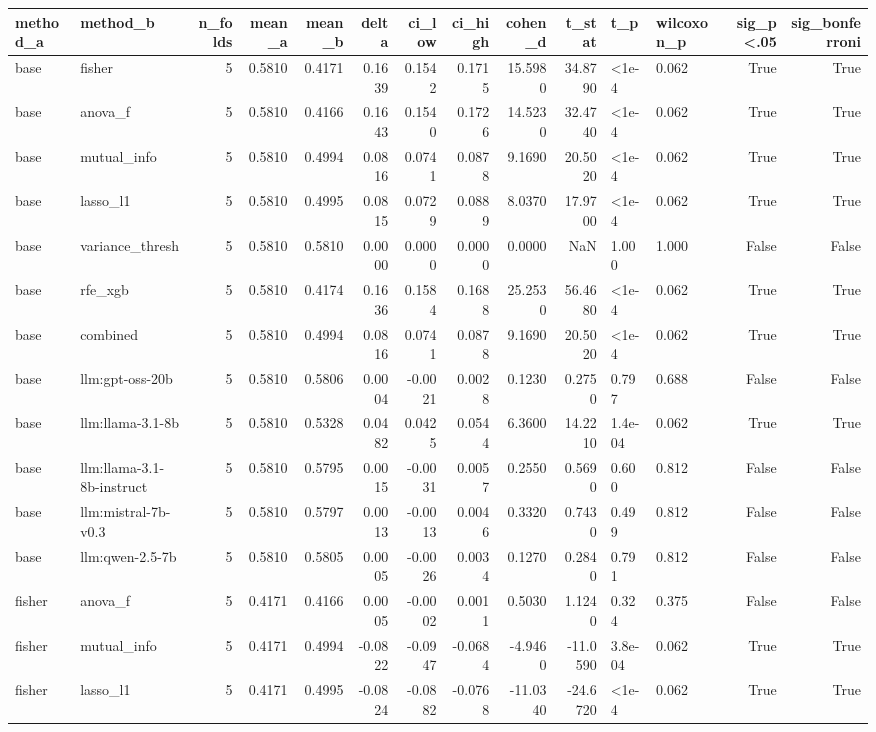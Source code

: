 \begin{tabular}{llrrrrrrrrllrr}
\toprule
method_a & method_b & n_folds & mean_a & mean_b & delta & ci_low & ci_high & cohen_d & t_stat & t_p & wilcoxon_p & sig_p<.05 & sig_bonferroni \\
\midrule
base & fisher & 5 & 0.5810 & 0.4171 & 0.1639 & 0.1542 & 0.1715 & 15.5980 & 34.8790 & <1e-4 & 0.062 & True & True \\
base & anova_f & 5 & 0.5810 & 0.4166 & 0.1643 & 0.1540 & 0.1726 & 14.5230 & 32.4740 & <1e-4 & 0.062 & True & True \\
base & mutual_info & 5 & 0.5810 & 0.4994 & 0.0816 & 0.0741 & 0.0878 & 9.1690 & 20.5020 & <1e-4 & 0.062 & True & True \\
base & lasso_l1 & 5 & 0.5810 & 0.4995 & 0.0815 & 0.0729 & 0.0889 & 8.0370 & 17.9700 & <1e-4 & 0.062 & True & True \\
base & variance_thresh & 5 & 0.5810 & 0.5810 & 0.0000 & 0.0000 & 0.0000 & 0.0000 & NaN & 1.000 & 1.000 & False & False \\
base & rfe_xgb & 5 & 0.5810 & 0.4174 & 0.1636 & 0.1584 & 0.1688 & 25.2530 & 56.4680 & <1e-4 & 0.062 & True & True \\
base & combined & 5 & 0.5810 & 0.4994 & 0.0816 & 0.0741 & 0.0878 & 9.1690 & 20.5020 & <1e-4 & 0.062 & True & True \\
base & llm:gpt-oss-20b & 5 & 0.5810 & 0.5806 & 0.0004 & -0.0021 & 0.0028 & 0.1230 & 0.2750 & 0.797 & 0.688 & False & False \\
base & llm:llama-3.1-8b & 5 & 0.5810 & 0.5328 & 0.0482 & 0.0425 & 0.0544 & 6.3600 & 14.2210 & 1.4e-04 & 0.062 & True & True \\
base & llm:llama-3.1-8b-instruct & 5 & 0.5810 & 0.5795 & 0.0015 & -0.0031 & 0.0057 & 0.2550 & 0.5690 & 0.600 & 0.812 & False & False \\
base & llm:mistral-7b-v0.3 & 5 & 0.5810 & 0.5797 & 0.0013 & -0.0013 & 0.0046 & 0.3320 & 0.7430 & 0.499 & 0.812 & False & False \\
base & llm:qwen-2.5-7b & 5 & 0.5810 & 0.5805 & 0.0005 & -0.0026 & 0.0034 & 0.1270 & 0.2840 & 0.791 & 0.812 & False & False \\
fisher & anova_f & 5 & 0.4171 & 0.4166 & 0.0005 & -0.0002 & 0.0011 & 0.5030 & 1.1240 & 0.324 & 0.375 & False & False \\
fisher & mutual_info & 5 & 0.4171 & 0.4994 & -0.0822 & -0.0947 & -0.0684 & -4.9460 & -11.0590 & 3.8e-04 & 0.062 & True & True \\
fisher & lasso_l1 & 5 & 0.4171 & 0.4995 & -0.0824 & -0.0882 & -0.0768 & -11.0340 & -24.6720 & <1e-4 & 0.062 & True & True \\

\end{tabular}
